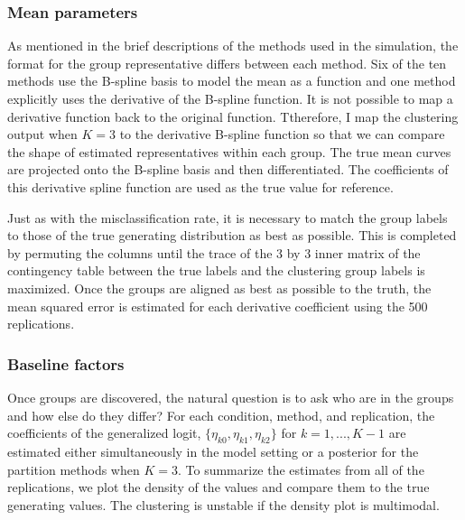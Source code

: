 \subsubsection{Mean parameters}
As mentioned in the brief descriptions of the methods used in the simulation, the format for the group representative differs between each method. Six of the ten methods use the B-spline basis to model the mean as a function and one method explicitly uses the derivative of the B-spline function. It is not possible to map a derivative function back to the original function. Ttherefore, I map the clustering output when $K=3$ to the derivative B-spline function so that we can compare the shape of estimated representatives within each group. The true mean curves are projected onto the B-spline basis and then differentiated. The coefficients of this derivative spline function are used as the true value for reference. 

Just as with the misclassification rate, it is necessary to match the group labels to those of the true generating distribution as best as possible. This is completed by permuting the columns until the trace of the 3 by 3 inner matrix of the contingency table between the true labels and the clustering group labels is maximized. Once the groups are aligned as best as possible to the truth, the mean squared error is estimated for each derivative coefficient using the 500 replications.

\subsubsection{Baseline factors}
Once groups are discovered, the natural question is to ask who are in the groups and how else do they differ? For each condition, method, and replication, the coefficients of the generalized logit, $\{\eta_{k0},\eta_{k1},\eta_{k2}\}$ for $k=1,...,K-1$ are estimated either simultaneously in the model setting or a posterior for the partition methods when $K=3$. To summarize the estimates from all of the replications, we plot the density of the values and compare them to the true generating values. The clustering is unstable if the density plot is multimodal.

